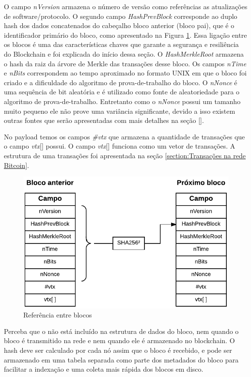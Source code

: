 \documentclass[conference,compsoc]{IEEEtran}
\begin{document}
O campo \textit{nVersion} armazena o número de versão como referências as atualizações de software/protocolo. O segundo campo \textit{HashPrevBlock} corresponde ao duplo hash dos dados concatenados do cabeçalho bloco anterior (bloco pai), que é o identificador primário do bloco, como apresentado na Figura \ref{fig:Ref_blocos}. Essa ligação entre os blocos é uma das características chaves que garante a segurança e resiliência do Blockchain e foi explicada do início dessa seção. O \textit{HashMerkleRoot} armazena o hash da raiz da árvore de Merkle das transações desse bloco. Os campos \textit{nTime} e \textit{nBits} correspondem ao tempo aproximado no formato UNIX em que o bloco foi criado e a dificuldade do algoritmo de prova-de-trabalho do bloco. O \textit{nNonce} é uma sequência de bit aleatória e é utilizado como fonte de aleatoriedade para o algoritmo de prova-de-trabalho. Entretanto como o \textit{nNonce} possui um tamanho muito pequeno ele não prove uma variância significante, devido a isso existem outras fontes que serão apresentadas com mais detalhes na seção \ref{}.

No payload temos os campos \textit{\#vtx} que armazena a quantidade de transações que o campo \textit{vtx}[] possui. O campo \textit{vtx}[] funciona como um vetor de transações. A estrutura de uma transações foi apresentada na seção \ref{section:Transações na rede Bitcoin}.

\begin{figure}[H]
    \centering
    \includegraphics[keepaspectratio=true, scale=0.6]{img/Referencia_entre_blocos.pdf}
    \caption{Referência entre blocos}
    \label{fig:Ref_blocos}
\end{figure}

Perceba que o não está incluído na estrutura de dados do bloco, nem quando o bloco é transmitido na rede e nem quando ele é armazenado no blockchain. O hash deve ser calculado por cada nó assim que o bloco é recebido, e pode ser armazenado em uma tabela separada como parte dos metadados do bloco para facilitar a indexação e uma coleta mais rápida dos blocos em disco. 
\end{document}
